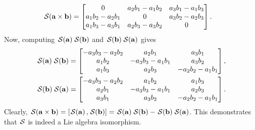 \begin{example}
\begin{align*}
        \SL[\mathbf{a}\times \mathbf{b}] &= \begin{bmatrix}
            0 & a_2b_1-a_1b_2 & a_3b_1-a_1b_3\\
            a_1b_2 - a_2b_1 & 0 & a_3b_2-a_2b_3\\
            a_1b_3-a_3b_1 & a_2b_3-a_3b_2 & 0
        \end{bmatrix}.
    \end{align*}
    Now, computing $\SL[\mathbf{a}]\SL[\mathbf{b}]$ and $\SL[\mathbf{b}]\SL[\mathbf{a}]$ gives
    \begin{align*}
        \SL[\mathbf{a}]\SL[\mathbf{b}] &=
        \begin{bmatrix}
            -a_3b_3 -a_2b_2 & a_2b_1 & a_3b_1\\
            a_1b_2 & -a_3b_3 - a_1b_1 & a_3b_2\\
            a_1b_3 & a_2b_3 & -a_2b_2 - a_1b_1
        \end{bmatrix},\\
        \SL[\mathbf{b}]\SL[\mathbf{a}] &=
        \begin{bmatrix}
            -a_3b_3 -a_2b_2 & a_1b_2 & a_1b_3\\
            a_2b_1 & -a_3b_3 - a_1b_1 & a_2b_3\\
            a_3b_1 & a_3b_2 & -a_2b_2 - a_1b_1
        \end{bmatrix}.
    \end{align*}
    Clearly, $\SL[\mathbf{a}\times \mathbf{b}] = [\SL[\mathbf{a}], \SL[\mathbf{b}]] = \SL[\mathbf{a}]\SL[\mathbf{b}] - \SL[\mathbf{b}]\SL[\mathbf{a}]$. This demonstrates that $\SL$ is indeed a Lie algebra isomorphism.
\end{example}

